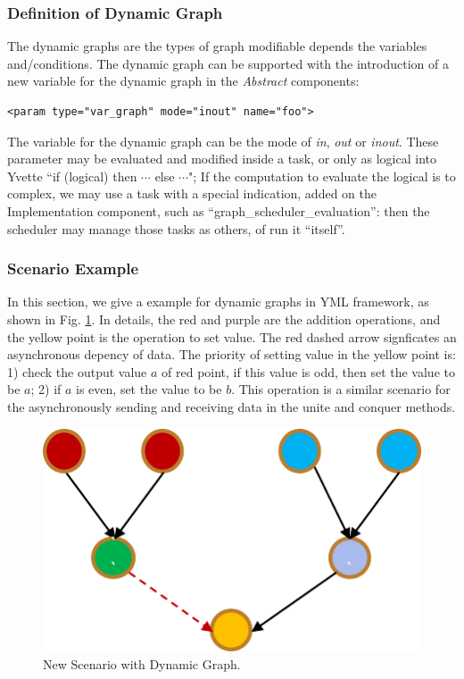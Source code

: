 \subsubsection{Definition of Dynamic Graph}

The dynamic graphs are the types of graph modifiable depends the variables and/conditions. The dynamic graph can be supported with the introduction of a new variable for the dynamic graph in the \textit{Abstract} components:

\lstset{language=XML}
\begin{lstlisting}[frame=single]
<param type="var_graph" mode="inout" name="foo">
\end{lstlisting}

The variable for the dynamic graph can be the mode of \textit{in}, \textit{out} or \textit{inout}. These parameter may be evaluated and modified inside a task, or only as logical into Yvette “if (logical) then $\cdots$ else $\cdots$"; If the computation to evaluate the logical is to complex, we may use a task with a special indication, added on the Implementation component, such as “graph\_scheduler\_evaluation”: then the scheduler may manage those tasks as others, of run it “itself”.

\subsubsection{Scenario Example}

In this section, we give a example for dynamic graphs in YML framework, as shown in Fig. \ref{fig:sum_workflow2}. In details, the red and purple are the addition operations, and the yellow point is the operation to set value. The red dashed arrow signficates an asynchronous depency of data. The priority of setting value in the yellow point is: 1) check the output value $a$ of red point, if this value is odd, then set the value to be $a$; 2) if $a$ is even, set the value to be $b$. This operation is a similar scenario for the asynchronously sending and receiving data in the unite and conquer methods.

\begin{figure}[htbp]
	\centering
	\includegraphics[width=3.in]{fig/sum_workflow2.pdf}
	\caption{New Scenario with Dynamic Graph.}
	\label{fig:sum_workflow2}
\end{figure}


